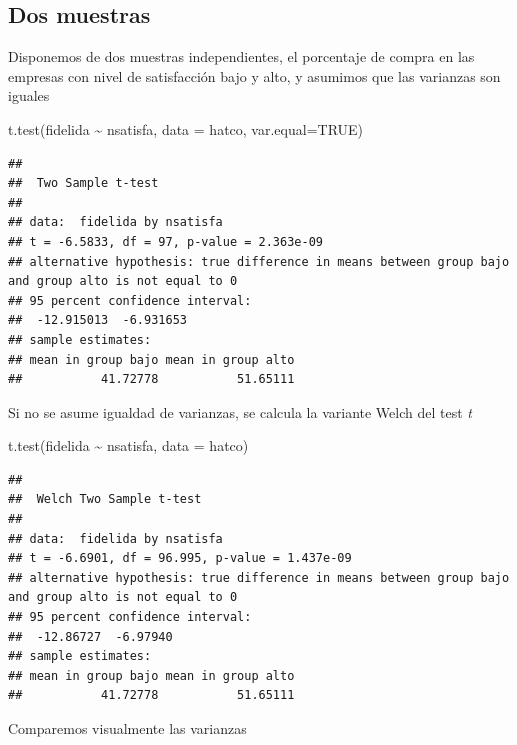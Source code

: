 \documentclass[
]{book}
\newenvironment{Shaded}{\begin{snugshade}}{\end{snugshade}}
\newcommand{\AttributeTok}[1]{\textcolor[rgb]{0.77,0.63,0.00}{#1}}
\newcommand{\ConstantTok}[1]{\textcolor[rgb]{0.00,0.00,0.00}{#1}}
\newcommand{\FunctionTok}[1]{\textcolor[rgb]{0.00,0.00,0.00}{#1}}
\newcommand{\NormalTok}[1]{#1}
\newcommand{\SpecialCharTok}[1]{\textcolor[rgb]{0.00,0.00,0.00}{#1}}
\theoremstyle{break}
\begin{document}
\hypertarget{dos-muestras}{%
\subsection{Dos muestras}\label{dos-muestras}}

Disponemos de dos muestras independientes, el porcentaje de compra
en las empresas con nivel de satisfacción bajo y alto,
y asumimos que las varianzas son iguales

\begin{Shaded}
\begin{Highlighting}[]
\FunctionTok{t.test}\NormalTok{(fidelida }\SpecialCharTok{\textasciitilde{}}\NormalTok{ nsatisfa, }\AttributeTok{data =}\NormalTok{ hatco, }\AttributeTok{var.equal=}\ConstantTok{TRUE}\NormalTok{)}
\end{Highlighting}
\end{Shaded}

\begin{verbatim}
## 
##  Two Sample t-test
## 
## data:  fidelida by nsatisfa
## t = -6.5833, df = 97, p-value = 2.363e-09
## alternative hypothesis: true difference in means between group bajo and group alto is not equal to 0
## 95 percent confidence interval:
##  -12.915013  -6.931653
## sample estimates:
## mean in group bajo mean in group alto 
##           41.72778           51.65111
\end{verbatim}

Si no se asume igualdad de varianzas, se calcula la variante Welch del test \emph{t}

\begin{Shaded}
\begin{Highlighting}[]
\FunctionTok{t.test}\NormalTok{(fidelida }\SpecialCharTok{\textasciitilde{}}\NormalTok{ nsatisfa, }\AttributeTok{data =}\NormalTok{ hatco)}
\end{Highlighting}
\end{Shaded}

\begin{verbatim}
## 
##  Welch Two Sample t-test
## 
## data:  fidelida by nsatisfa
## t = -6.6901, df = 96.995, p-value = 1.437e-09
## alternative hypothesis: true difference in means between group bajo and group alto is not equal to 0
## 95 percent confidence interval:
##  -12.86727  -6.97940
## sample estimates:
## mean in group bajo mean in group alto 
##           41.72778           51.65111
\end{verbatim}

Comparemos visualmente las varianzas
\end{document}
